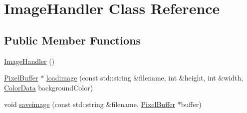 \hypertarget{classImageHandler}{}\section{Image\+Handler Class Reference}
\label{classImageHandler}
\subsection*{Public Member Functions}
\begin{DoxyCompactItemize}
\item 
\hyperlink{classImageHandler_a86d8324568727c2799a54a43d7296ddb}{Image\+Handler} ()
\item 
\hyperlink{classPixelBuffer}{Pixel\+Buffer} $\ast$ \hyperlink{classImageHandler_a0042244c7f1462f4ffc2403f139bf286}{loadimage} (const std\+::string \&filename, int \&height, int \&width, \hyperlink{classColorData}{Color\+Data} background\+Color)
\item 
void \hyperlink{classImageHandler_ace874907681fc4970f6a2ae2377833b9}{saveimage} (const std\+::string \&filename, \hyperlink{classPixelBuffer}{Pixel\+Buffer} $\ast$buffer)
\end{DoxyCompactItemize}
